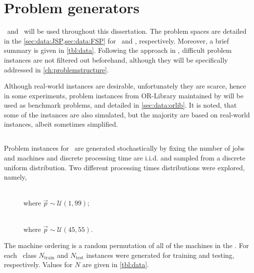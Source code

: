 
\chapter{Problem generators}\label{ch:genprobleminstances} 

 \JSP\ and \FSP\  will be used  throughout this dissertation. The  problem spaces are detailed in the \cref{sec:data:JSP,sec:data:FSP} for \JSP\ and \FSP, respectively. Moreover, a brief summary is given in \cref{tbl:data}.
Following the approach in \citet{Whitley}, difficult problem instances are not filtered out beforehand, although they will be specifically addressed in \cref{ch:problemstructure}. 

Although real-world instances are desirable, unfortunately they are scarce, hence in some experiments, problem instances from OR-Library maintained by \citet{ORlibrary} will be used as benchmark problems, and detailed in \cref{sec:data:orlib}. It is noted, that some of the instances are also simulated, but the majority are based on real-world instances, albeit sometimes simplified. 

\section{\Jsp}\label{sec:data:JSP}
Problem instances for \JSP\ are generated stochastically by fixing the number of jobs and machines and 
discrete processing time are i.i.d. and sampled from a discrete uniform distribution. %
Two different processing times distributions were explored, namely,
\begin{description}
\item[\Jrnd]  \hfill \\ where $\vec{p}\sim\mathcal{U}(1,99)$;
\item[\Jrndn]  \hfill \\ where $\vec{p}\sim\mathcal{U}(45,55)$.
\end{description}
The machine ordering is a random permutation of all of the machines in the \jsp. 
For each \JSP\ class $N_{\text{train}}$  and $N_{\text{test}}$ instances were generated for training and testing, respectively. Values for $N$ are given in \cref{tbl:data}. 

